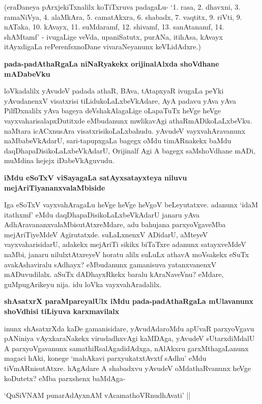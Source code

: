 (eraDaneya pArxjekiTxnalilx koTiTxruva padagaLu- `1. rasa, 2. dhavxni, 3. ramaNiVya, 4. alaMkAra, 5. camatAkxra, 6. shabadx, 7. vaqtitx, 9. riVti, 9. nATaka, 10. kAvayx, 11. suMdaramf, 12. shivamf, 13. sanAtanamf, 14. shAMtamf' - ivugaLige veVda, upaniSatutx, purANa, itihAsa, kAvayx itAyxdigaLa rePerenfsxnoDane vivaraNeyanunx keVLidAdxre.)

\noindent
{\bf\large{pada-padAthaRgaLa niNaRyakekx orijinalAlxda shoVdhane mADabeVku}}\label{page215}

loVkadalilx yAvudeV padada athaR, BAva, tAtapxyaR ivugaLa peYki yAvudanenxV visatxrisi tiLidukoLaLxbeVkAdare, AyA padavu yAva yAva PilfDxnalilx yAva bageya deVshakAlagaLige oLapaTuTx heVge heVge vayxvaharisalapxDutitxde eMbudanunx mwlikavAgi athaRmADikoLaLxbeVku. naMtara icACxnusAra visatxrisikoLaLxbahudu. yAvudeV vayxvahAravanunx naMbabeVkAdarU, sari-tapupxgaLa bagegx oMdu timARnakekx baMdu daqDhapaDisikoLaLxbeVkAdarU, Orijinalf Agi A bagegx saMshoVdhane mADi, muMdina hejejx iDabeVkAguvudu.

\noindent
{\bf\large{iMdu eSoTxV viSayagaLa satAyxsatayxteya niluvu mejAriTiyananxvalaMbiside}}\label{page215}

Iga eSoTxV vayxvahAragaLu heVge heVge heVgoV beLeyutatxve. adanunx `idaM itathxmf' eMdu daqDhapaDisikoLaLxbeVkAdarU janaru yAva AdhAravananxvalaMbisutAtxreMdare, adu bahujana parxyoVgaveMba mejAriTiyeMdeV Agirutatxde. suLaLxnenxV ADidarU, aMteyeV vayxvaharisidarU, adakekx mejAriTi sikikx biTaTxre adanunx satayxveMdeV naMbi, janaru nilulxtAtxreyeV horatu alilx suLuLx athavA moVsakekx eSuTx avakAshaviralu sAdhayx? eMbudanunx gamanisuva yatanxvanenxV mADuvudilalx. aSuTx dADhayxRkekx baralu kAraNaveVnu? eMdare, guMpugArikeyu nija. idu loVka vayxvahAradalilx.

\noindent
{\bf\large{shAsatxrX paraMpareyalUlx iMdu pada-padAthaRgaLa mUlavanunx shoVdhisi tiLiyuva karxmavilalx}}\label{page216}

inunx shAsatxrXda kaDe gamanisidare, yAvudAdaroMdu apUvaR parxyoVgavu pANiniya vAyxkaraNakekx virudadhxvAgi kaMDAga, yAvudeV sUtarxdiMdalU A parxyoVgavanunx samathiRsalAgadidAdxga, nAlAkxru garxMthagaLanunx magaci hAki, konege `mahAkavi parxyukatxtAvxtf sAdhu'\label{216} eMdu tiVmARnisutAtxre. hAgAdare A shabadxvu yAvudeV oMdathaRvanunx heVge koDutetx? eMba parxshenx baMdAga-

\begin{shloka}
`QuSiVNAM punarAdAyxnAM vAcamathoVRnudhAvati' ||\label{216}
\end{shloka}

